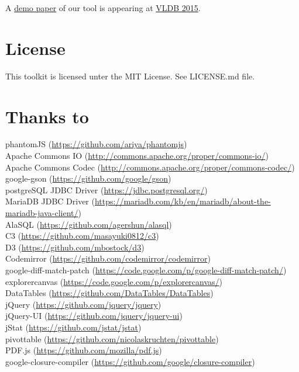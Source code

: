 \documentclass[11pt]{article}
\begin{document}
\noindent A \href{https://infosys.uni-saarland.de/publications/p1972-dittrich.html}{demo paper} of our tool is appearing at \href{http://www.vldb.org/2015/}{VLDB 2015}. 

\section{License}
\noindent This toolkit is licensed unter the MIT License. See LICENSE.md file.\\

\newpage
\tableofcontents
\newpage

\section{Thanks to}
phantomJS (\url{https://github.com/ariya/phantomjs})\\
Apache Commons IO (\url{http://commons.apache.org/proper/commons-io/})\\
Apache Commons Codec (\url{http://commons.apache.org/proper/commons-codec/})\\
google-gson (\url{https://github.com/google/gson})\\
postgreSQL JDBC Driver (\url{https://jdbc.postgresql.org/})\\
MariaDB JDBC Driver (\url{https://mariadb.com/kb/en/mariadb/about-the-mariadb-java-client/})\\
AlaSQL (\url{https://github.com/agershun/alasql})\\
C3 (\url{https://github.com/masayuki0812/c3})\\
D3 (\url{https://github.com/mbostock/d3})\\
Codemirror (\url{https://github.com/codemirror/codemirror})\\
google-diff-match-patch (\url{https://code.google.com/p/google-diff-match-patch/})\\
explorercanvas (\url{https://code.google.com/p/explorercanvas/})\\
DataTables (\url{https://github.com/DataTables/DataTables})\\
jQuery (\url{https://github.com/jquery/jquery})\\
jQuery-UI (\url{https://github.com/jquery/jquery-ui})\\
jStat (\url{https://github.com/jstat/jstat})\\
pivottable (\url{https://github.com/nicolaskruchten/pivottable})\\
PDF.js (\url{https://github.com/mozilla/pdf.js})\\
google-closure-compiler (\url{https://github.com/google/closure-compiler})\\
\end{document}
